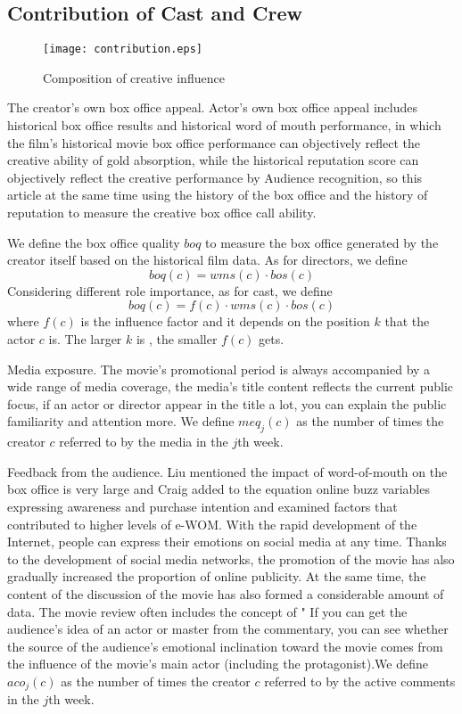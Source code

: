 \subsection{Contribution of Cast and Crew}
\begin{figure}[!htbp]
\centering
\texttt{[image: contribution.eps]}
\caption{Composition of creative influence}
\label{fig:influ}
\end{figure}
\par The creator's own box office appeal. Actor's own box office appeal includes historical box office results and historical word of mouth performance, in which the film's historical movie box office performance can objectively reflect the creative ability of gold absorption, while the historical reputation score can objectively reflect the creative performance by Audience recognition, so this article at the same time using the history of the box office and the history of reputation to measure the creative box office call ability.
\par We define the box office quality $boq$ to measure the box office generated by the creator itself based on the historical film data.
As for directors, we define
\begin{equation}
   boq(c)=wms(c)\cdot bos(c)
\end{equation}
Considering different role importance, as for cast, we define
\begin{equation}
    boq(c) = f(c)\cdot wms(c)\cdot bos(c)
\end{equation}
where $f(c)$ is the influence factor and it depends on the position $k$ that the actor $c$ is. The larger $k$ is , the smaller $f(c)$ gets.
\par Media exposure. The movie's promotional period is always accompanied by a wide range of media coverage, the media's title content reflects the current public focus, if an actor or director appear in the title a lot, you can explain the public familiarity and attention more. We define $meq_j(c)$ as the number of times the creator $c$ referred to by the media in the $j$th week.
\par Feedback from the audience. Liu \cite{liu2006word} mentioned the impact of word-of-mouth on the box office is very large and Craig \cite{craig2015word}added to the equation online buzz variables expressing awareness and purchase intention and examined factors that contributed to higher levels of e-WOM. With the rapid development of the Internet, people can express their emotions on social media at any time. Thanks to the development of social media networks, the promotion of the movie has also gradually increased the proportion of online publicity. At the same time, the content of the discussion of the movie has also formed a considerable amount of data. The movie review often includes the concept of " If you can get the audience's idea of ​​an actor or master from the commentary, you can see whether the source of the audience's emotional inclination toward the movie comes from the influence of the movie's main actor (including the protagonist).We define $aco_j(c)$ as the number of times the creator $c$ referred to by the active comments in the $j$th week.
